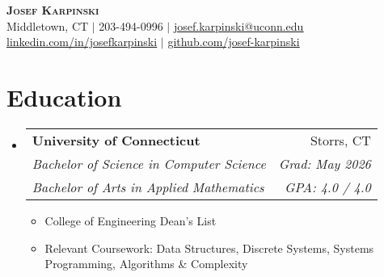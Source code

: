 \documentclass[letterpaper,11pt]{article}
\makeatletter
\newcommand{\resumeItem}[1]{
  \item\small{
    {#1 \vspace{-2pt}}
  }
}
\newcommand{\resumeEduSubheading}[6]{
  \vspace{-2pt}\item
    \begin{tabular*}{0.97\textwidth}[t]{l@{\extracolsep{\fill}}r}
      \textbf{#1} & #2 \\
      \textit{\small#3} & \textit{\small #4} \\
      \textit{\small#5} & \textit{\small #6} \\
    \end{tabular*}\vspace{-7pt}
}
\newcommand{\resumeSubHeadingListStart}{\begin{itemize}[leftmargin=0.15in, label={}]}
\newcommand{\resumeSubHeadingListEnd}{\end{itemize}}
\newcommand{\resumeItemListStart}{\begin{itemize}}
\newcommand{\resumeItemListEnd}{\end{itemize}\vspace{-5pt}}
\makeatother
\begin{document}

\begin{center}
    \textbf{\Huge \scshape Josef Karpinski} \\ \vspace{1pt}
    \small Middletown, CT $|$ 203-494-0996 $|$ \href{mailto:x@x.com}{\underline{josef.karpinski@uconn.edu}}  \\ \vspace{1pt}
    \href{https://linkedin.com/in/josefkarpinski}{\underline{linkedin.com/in/josefkarpinski}} $|$
    \href{https://github.com/josef-karpinski}{\underline{github.com/josef-karpinski}}
\end{center}


\section{Education}
  \resumeSubHeadingListStart
    \resumeEduSubheading
      {University of Connecticut}{Storrs, CT}
      {Bachelor of Science in Computer Science}{Grad: May 2026}
      {Bachelor of Arts in Applied Mathematics}{GPA: 4.0 / 4.0}
      \resumeItemListStart
        \resumeItem{College of Engineering Dean's List}
        \resumeItem{Relevant Coursework: Data Structures, Discrete Systems, Systems Programming, Algorithms \& Complexity }
      \resumeItemListEnd


  \resumeSubHeadingListEnd


\end{document}
